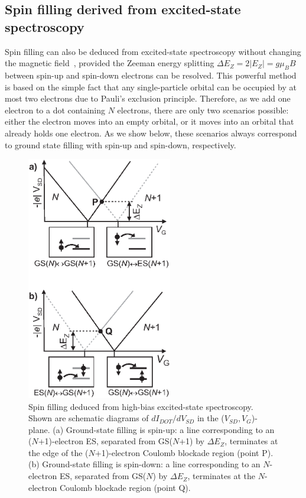\documentclass[rmp,twocolumn,aps]{revtex4}
\begin{document}
\subsection{Spin filling derived from excited-state spectroscopy}
Spin filling can also be deduced from excited-state spectroscopy
without changing the magnetic field~\cite{Cobden98}, provided the
Zeeman energy splitting $\Delta E_Z=2\left|E_Z\right|=g \mu_B B$
between spin-up and spin-down electrons can be resolved. This
powerful method is based on the simple fact that any
single-particle orbital can be occupied by at most two electrons
due to Pauli's exclusion principle. Therefore, as we add one
electron to a dot containing $N$ electrons, there are only two
scenarios possible: either the electron moves into an empty
orbital, or it moves into an orbital that already holds one
electron. As we show below, these scenarios always correspond to
ground state filling with spin-up and spin-down, respectively.

\begin{figure}[htb]
\begin{center}
\includegraphics[width=2.5in, clip=true]{hanson_fig06.eps}
\end{center}
\caption{\label{fig:ESspinfilling} Spin filling deduced from
high-bias excited-state spectroscopy. Shown are schematic diagrams
of $dI_{DOT}/dV_{SD}$ in the ($V_{SD},V_G$)-plane. (a)
Ground-state filling is spin-up: a line corresponding to an
($N$+1)-electron ES, separated from GS($N$+1) by $\Delta E_{Z}$,
terminates at the edge of the ($N$+1)-electron Coulomb blockade
region (point P). (b) Ground-state filling is spin-down: a line
corresponding to an $N$-electron ES, separated from GS($N$) by
$\Delta E_{Z}$, terminates at the $N$-electron Coulomb blockade
region (point Q).}
\end{figure}
\end{document}
